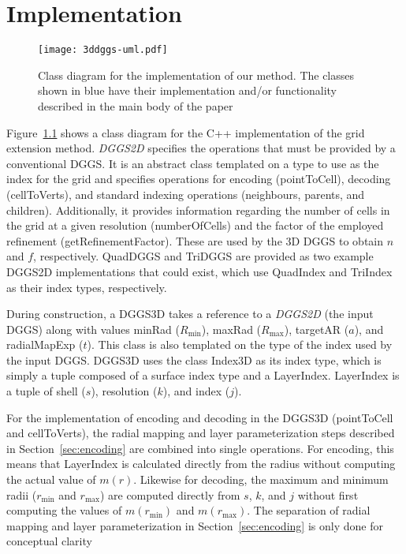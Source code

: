\chapter{Implementation} \label{chap:implementation}

\begin{figure}[h]
	\centering
	\texttt{[image: 3ddggs-uml.pdf]}
	\caption[Title]{
		Class diagram for the implementation of our method. The classes shown in blue have their implementation and/or functionality described in the main body of the paper
	}
	\label{fig:uml}
\end{figure}

Figure~\ref{fig:uml} shows a class diagram for the C++ implementation of the grid extension method. \textit{DGGS2D} specifies the operations that must be provided by a conventional DGGS. It is an abstract class templated on a type to use as the index for the grid and specifies operations for encoding (pointToCell), decoding (cellToVerts), and standard indexing operations (neighbours, parents, and children). Additionally, it provides information regarding the number of cells in the grid at a given resolution (numberOfCells) and the factor of the employed refinement (getRefinementFactor). These are used by the 3D DGGS to obtain $n$ and $f$, respectively. QuadDGGS and TriDGGS are provided as two example DGGS2D implementations that could exist, which use QuadIndex and TriIndex as their index types, respectively.

During construction, a DGGS3D takes a reference to a \textit{DGGS2D} (the input DGGS) along with values minRad ($R_\mathrm{min}$), maxRad ($R_\mathrm{max}$), targetAR ($a$), and radialMapExp ($t$). This class is also templated on the type of the index used by the input DGGS. DGGS3D uses the class Index3D as its index type, which is simply a tuple composed of a surface index type and a LayerIndex. LayerIndex is a tuple of shell ($s$), resolution ($k$), and index ($j$).

For the implementation of encoding and decoding in the DGGS3D (pointToCell and cellToVerts), the radial mapping and layer parameterization steps described in Section~\ref{sec:encoding} are combined into single operations. For encoding, this means that LayerIndex is calculated directly from the radius without computing the actual value of $m(r)$. Likewise for decoding, the maximum and minimum radii ($r_\mathrm{min}$ and $r_\mathrm{max}$) are computed directly from $s$, $k$, and $j$ without first computing the values of $m(r_\mathrm{min})$ and $m(r_\mathrm{max})$. The separation of radial mapping and layer parameterization in Section~\ref{sec:encoding} is only done for conceptual clarity